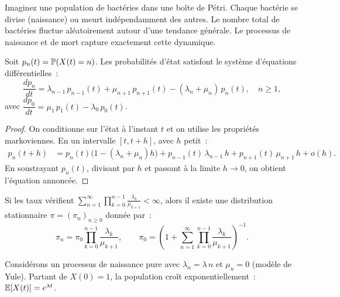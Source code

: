 \begin{intuition}
Imaginez une population de bact\'eries dans une bo\^ite de P\'etri.
Chaque bact\'erie se divise (naissance) ou meurt ind\'ependamment des
autres. Le nombre total de bact\'eries fluctue al\'eatoirement autour
d'une tendance g\'en\'erale. Le processus de naissance et de mort
capture exactement cette dynamique.
\end{intuition}

\begin{proposition}
\label{prop:kolmogorov_nm}
Soit $p_n(t) = \mathbb{P}(X(t) = n)$. Les probabilit\'es d'\'etat satisfont le
syst\`eme d'\'equations diff\'erentielles~:
\[
  \frac{dp_n}{dt} = \lambda_{n-1}\, p_{n-1}(t) + \mu_{n+1}\, p_{n+1}(t)
    - (\lambda_n + \mu_n)\, p_n(t), \quad n \geq 1,
\]
avec $\dfrac{dp_0}{dt} = \mu_1\, p_1(t) - \lambda_0\, p_0(t)$.
\end{proposition}

\begin{proof}
On conditionne sur l'\'etat \`a l'instant $t$ et on utilise les propri\'et\'es
markoviennes. En un intervalle $[t, t+h]$, avec $h$ petit~:
\begin{align*}
  p_n(t+h) &= p_n(t)\bigl(1 - (\lambda_n + \mu_n)h\bigr)
    + p_{n-1}(t)\,\lambda_{n-1}\,h + p_{n+1}(t)\,\mu_{n+1}\,h + o(h).
\end{align*}
En soustrayant $p_n(t)$, divisant par $h$ et passant \`a la limite $h \to 0$,
on obtient l'\'equation annonc\'ee.
\end{proof}

\begin{theoreme}
\label{thm:stat_nm}
Si les taux v\'erifient $\sum_{n=1}^{\infty} \prod_{k=0}^{n-1}
\frac{\lambda_k}{\mu_{k+1}} < \infty$, alors il existe une distribution
stationnaire $\pi = (\pi_n)_{n \geq 0}$ donn\'ee par~:
\[
  \pi_n = \pi_0 \prod_{k=0}^{n-1} \frac{\lambda_k}{\mu_{k+1}},
  \qquad \pi_0 = \left(1 + \sum_{n=1}^{\infty} \prod_{k=0}^{n-1}
  \frac{\lambda_k}{\mu_{k+1}}\right)^{-1}.
\]
\end{theoreme}

\begin{exemple}
Consid\'erons un processus de naissance pure avec $\lambda_n = \lambda\, n$
et $\mu_n = 0$ (mod\`ele de Yule).
Partant de $X(0)=1$, la population cro\^it exponentiellement~:
$\mathbb{E}[X(t)] = e^{\lambda t}$.
\end{exemple}

